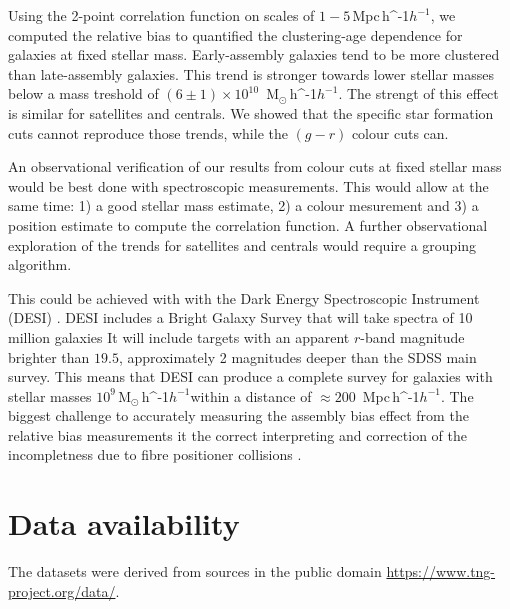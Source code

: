 \documentclass[fleqn,usenatbib]{mnras}
\newcommand{\Msunh}{\,{\rm M}$_{\odot}$\,\ifmmode h^{-1}\else $h^{-1}$\fi}
\newcommand{\Mpch}{\,{\rm Mpc}\,\ifmmode h^{-1}\else $h^{-1}$\fi}
\begin{document}
Using the 2-point correlation function on scales of $1-5$\Mpch, 
we computed the relative bias to  quantified the clustering-age
dependence for galaxies at fixed stellar mass.
Early-assembly galaxies tend to be more clustered than late-assembly galaxies.
This trend is stronger towards lower stellar masses below a mass
treshold of $(6\pm1)\times 10^{10}$ \Msunh.  
The strengt of this effect is similar for satellites and centrals. 
We showed that the specific star formation cuts cannot reproduce those
trends, while the $(g-r)$ colour cuts can. 

An observational verification of our results from colour cuts at
fixed stellar mass would be best done with spectroscopic
measurements. 
This would allow at the same time: 1) a good stellar mass estimate,
2) a colour mesurement and 3) a position estimate to compute the
correlation function.
A further observational exploration of the trends for satellites and
centrals would require a grouping algorithm.

This could be achieved with with the Dark Energy Spectroscopic
Instrument (DESI) \citep{2016arXiv161100036D}. 
DESI includes a Bright Galaxy Survey that will take spectra of
10 million galaxies 
It will include  targets with an apparent $r$-band magnitude brighter
than $19.5$, approximately 2 magnitudes deeper than the SDSS
main survey.  
This means that DESI can produce a complete survey for galaxies with
stellar masses $10^{9}$\Msunh within a distance of $\approx 200$
\Mpch. 
The biggest challenge to accurately measuring the assembly bias effect
from the relative bias measurements it the  correct interpreting and
correction of the incompletness due to fibre positioner collisions
\citep{2019MNRAS.484.1285S}.  


\section*{Data availability}
The datasets were derived from sources in the public domain
\url{https://www.tng-project.org/data/}. 






\bsp	%
\label{lastpage}
\end{document}
